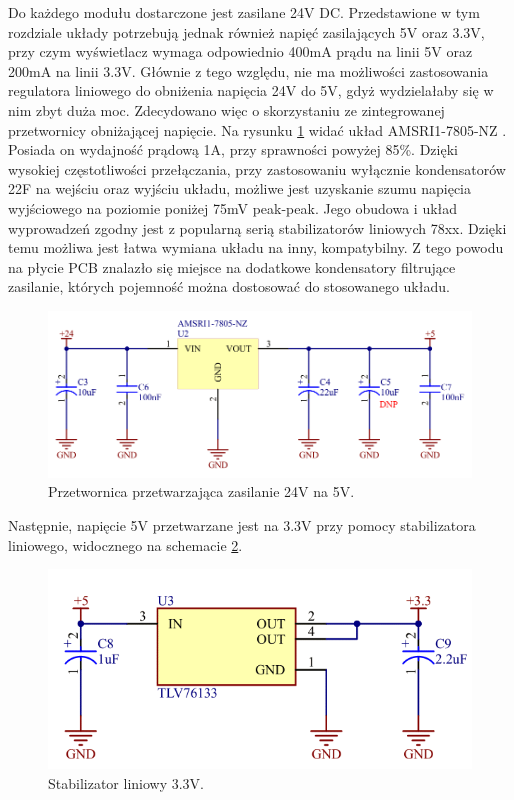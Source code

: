 Do każdego modułu dostarczone jest zasilane 24V DC. Przedstawione w tym rozdziale układy potrzebują jednak również napięć zasilających 5V oraz 3.3V, przy czym 
wyświetlacz wymaga odpowiednio 400mA prądu na linii 5V oraz 200mA na linii 3.3V. Głównie z tego względu, nie ma możliwości zastosowania regulatora liniowego do obniżenia
napięcia 24V do 5V, gdyż wydzielałaby się w nim zbyt duża moc. Zdecydowano więc o skorzystaniu ze zintegrowanej przetwornicy obniżającej napięcie. 
Na rysunku \ref{fig:sekcjaZasilania5v} widać układ AMSRI1-7805-NZ \cite{AMSRI1}. Posiada on wydajność prądową 1A, przy sprawności powyżej 85\%. Dzięki wysokiej częstotliwości przełączania,
przy zastosowaniu wyłącznie kondensatorów 22\mu F na wejściu oraz wyjściu układu, możliwe jest uzyskanie szumu napięcia wyjściowego na poziomie poniżej 75mV peak-peak.
Jego obudowa i układ wyprowadzeń zgodny jest z popularną serią stabilizatorów liniowych 78xx. Dzięki temu możliwa jest łatwa wymiana układu na inny, kompatybilny. 
Z tego powodu na płycie PCB znalazło się miejsce na dodatkowe kondensatory filtrujące zasilanie, których pojemność można dostosować do 
stosowanego układu.

\begin{figure}[h!]
    \begin{center}
        \includegraphics[width = 17cm]{images/zasilanie5v_3.png}
        \caption{Przetwornica przetwarzająca zasilanie 24V na 5V.} 
        \label{fig:sekcjaZasilania5v}
    \end{center}
\end{figure}

Następnie, napięcie 5V przetwarzane jest na 3.3V przy pomocy stabilizatora liniowego, widocznego na schemacie \ref{fig:sekcjaZasilania3v}.

\begin{figure}[h!]
    \begin{center}
        \includegraphics[width = 13cm]{images/zasilanie3v_3.png}
        \caption{Stabilizator liniowy 3.3V.} 
        \label{fig:sekcjaZasilania3v}
    \end{center}
\end{figure}

